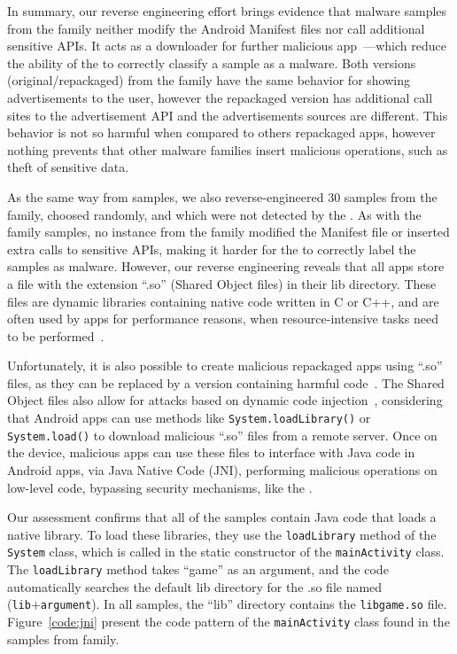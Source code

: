 In summary, our reverse engineering effort brings evidence that malware samples from the \gps family neither modify the Android Manifest files nor call additional sensitive APIs. It acts as a
downloader for further malicious app~\cite{DBLP:conf/ndss/ArpSHGR14}---which reduce the ability of the \mas to correctly classify a sample as a malware. Both versions (original/repackaged) from the \gps family have the same behavior for showing advertisements to the user,
however the repackaged version has additional call sites to the advertisement API and the advertisements sources are different. This behavior is not so harmful when compared to others repackaged apps, however nothing prevents that other malware families insert malicious operations, such as theft of sensitive data.


As the same way from \gps samples, we also reverse-engineered 30 samples from the \rmb family, choosed randomly, and which were not detected by the \mas. As with the \gps family samples, no instance from the \rmb family modified the Manifest file or inserted extra calls to sensitive APIs, making it harder for the \mas to correctly label the samples as malware. However, our reverse engineering reveals that all apps store a file with the extension ``.so'' (Shared Object files) in their lib directory. These files are dynamic libraries containing native code written in C or C++, and are often used by apps for performance reasons, when resource-intensive tasks need to be performed~\cite{ruggia2023dark}.

Unfortunately, it is also possible to create malicious repackaged apps using ``.so'' files, as they can be replaced by a version containing harmful code~\cite{DBLP:conf/dsn/QianLSC14}. The Shared Object files also allow for attacks based on dynamic code injection~\cite{DBLP:conf/acsac/FalsinaFZKVM15}, considering that Android apps can use methods like \texttt{System.loadLibrary()} or \texttt{System.load()} to download malicious ``.so''  files from a remote server. Once on the device, malicious apps can use these files to interface with Java code in Android apps, via Java Native Code (JNI), performing malicious operations on low-level code, bypassing security mechanisms, like the \mas.


Our assessment confirms that all of the samples contain Java code that loads a native library. To load these libraries, they use the \texttt{loadLibrary} method of the \texttt{System} class, which is called in the static constructor of the \texttt{mainActivity} class. The \texttt{loadLibrary} method takes ``game'' as an argument, and the code automatically searches the default lib directory for the .so file named (\texttt{lib}+\texttt{argument}). In all samples, the ``lib'' directory contains the \texttt{libgame.so} file. Figure~\ref{code:jni} present the code pattern of the \texttt{mainActivity} class found in the samples from \rmb family.



